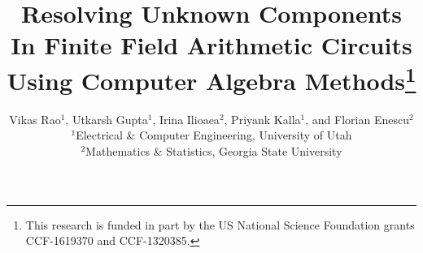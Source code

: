 \documentclass[10pt,twocolumn,fleqn]{IEEEtran}
\theoremstyle{definition}
\begin{document}
\setlength{\abovedisplayskip}{0pt}
\setlength{\belowdisplayskip}{0pt}
\setlength{\abovedisplayshortskip}{0pt}
\setlength{\belowdisplayshortskip}{0pt}
\title{\Large{{R}esolving {U}nknown {C}omponents {I}n {F}inite {F}ield {A}rithmetic {C}ircuits {U}sing {C}omputer {A}lgebra {M}ethods}\thanks{This research is funded in part by the
   US National Science Foundation grants CCF-1619370 and
   CCF-1320385.}}

\author{Vikas Rao$^1$, Utkarsh Gupta$^1$, Irina Ilioaea$^2$, Priyank Kalla$^1$, and Florian Enescu$^2$\\
$^1$Electrical \& Computer Engineering, University of Utah\\
$^2$Mathematics \& Statistics, Georgia State University \vspace{-0.2in}
}

\maketitle
\thispagestyle{empty}









\end{document}
